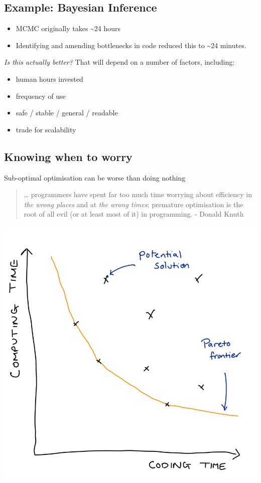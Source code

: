\documentclass[
  12pt,
]{book}
\providecommand{\tightlist}{%
  \setlength{\itemsep}{0pt}\setlength{\parskip}{0pt}}
\begin{document}
\hypertarget{example-bayesian-inference}{%
\subsection{Example: Bayesian Inference}\label{example-bayesian-inference}}

\begin{itemize}
\item
  MCMC originally takes \textasciitilde24 hours
\item
  Identifying and amending bottlenecks in code reduced this to \textasciitilde24 minutes.
\end{itemize}

\emph{Is this actually better?} That will depend on a number of factors, including:

\begin{itemize}
\tightlist
\item
  human hours invested
\item
  frequency of use
\item
  safe / stable / general / readable
\item
  trade for scalability
\end{itemize}

\hypertarget{knowing-when-to-worry}{%
\subsection{Knowing when to worry}\label{knowing-when-to-worry}}

Sub-optimal optimisation can be worse than doing nothing

\begin{quote}
\ldots{} programmers have spent far too much time worrying about efficiency in \emph{the wrong places} and at \emph{the wrong times}; premature optimisation is the root of all evil (or at least most of it) in programming. - Donald Knuth
\end{quote}

\includegraphics[width=12.5in]{images/403-production-scalability/pareto-frontier}
\end{document}
